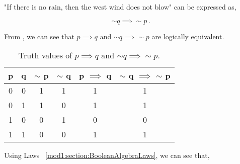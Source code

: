 \begin{subquestions}
\begin{subsubquestions}
\begin{subsubsubquestions}

\subsubsubquestion

"If there is no rain, then the west wind does not blow" can be expressed as,

\begin{equation}
	\sim q \implies \sim p\,.
\end{equation}

\end{subsubsubquestions}


\subsubquestion

From , we can see that $p \implies q$ and $\sim q \implies \sim p$ are logically equivalent.

\begin{table}[ht]
	\centering
	\begin{tabular}{|c|c|c|c|c|c|}
		\hline
		p & q & $\sim$ p & $\sim$ q & p $\implies$ q & $\sim$ q $\implies$ $\sim$ p \\
		\hline
		0 & 0 & 1 & 1 & 1 & 1 \\
	    0 & 1 & 1 & 0 & 1 & 1 \\
	    1 & 0 & 0 & 1 & 0 & 0 \\
	    1 & 1 & 0 & 0 & 1 & 1 \\
	    \hline
	\end{tabular}
	\caption{\label{2011:q1:tab:TruthTab2} Truth values of  $p \implies q$ and $\sim q \implies \sim p$.}
\end{table}

\end{subsubquestions}


\subquestion

Using Laws ~\ref{mod1:section:BooleanAlgebraLaws}, we can see that,


\end{subquestions}
